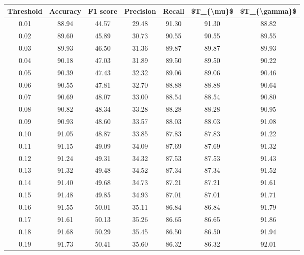 \begin{tabular}{|c|c|c|c|c|c|c|}
\hline
 Threshold &  Accuracy &  F1 score &  Precision &  Recall &  \$T\_\{\textbackslash mu\}\$ &  \$T\_\{\textbackslash gamma\}\$ \\
\hline
      0.01 &     88.94 &     44.57 &      29.48 &   91.30 &      91.30 &         88.82 \\
      0.02 &     89.60 &     45.89 &      30.73 &   90.55 &      90.55 &         89.55 \\
      0.03 &     89.93 &     46.50 &      31.36 &   89.87 &      89.87 &         89.93 \\
      0.04 &     90.18 &     47.03 &      31.89 &   89.50 &      89.50 &         90.22 \\
      0.05 &     90.39 &     47.43 &      32.32 &   89.06 &      89.06 &         90.46 \\
      0.06 &     90.55 &     47.81 &      32.70 &   88.88 &      88.88 &         90.64 \\
      0.07 &     90.69 &     48.07 &      33.00 &   88.54 &      88.54 &         90.80 \\
      0.08 &     90.82 &     48.34 &      33.28 &   88.28 &      88.28 &         90.95 \\
      0.09 &     90.93 &     48.60 &      33.57 &   88.03 &      88.03 &         91.08 \\
      0.10 &     91.05 &     48.87 &      33.85 &   87.83 &      87.83 &         91.22 \\
      0.11 &     91.15 &     49.09 &      34.09 &   87.69 &      87.69 &         91.32 \\
      0.12 &     91.24 &     49.31 &      34.32 &   87.53 &      87.53 &         91.43 \\
      0.13 &     91.32 &     49.48 &      34.52 &   87.34 &      87.34 &         91.52 \\
      0.14 &     91.40 &     49.68 &      34.73 &   87.21 &      87.21 &         91.61 \\
      0.15 &     91.48 &     49.85 &      34.93 &   87.01 &      87.01 &         91.71 \\
      0.16 &     91.55 &     50.01 &      35.11 &   86.84 &      86.84 &         91.79 \\
      0.17 &     91.61 &     50.13 &      35.26 &   86.65 &      86.65 &         91.86 \\
      0.18 &     91.68 &     50.29 &      35.45 &   86.50 &      86.50 &         91.94 \\
      0.19 &     91.73 &     50.41 &      35.60 &   86.32 &      86.32 &         92.01 \\

\end{tabular}
